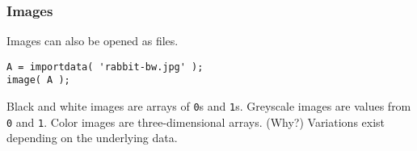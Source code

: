 \documentclass[11pt]{beamer}
\begin{document}
\begin{frame}[fragile]
  \frametitle{Images}
  \Enlarge

  \begin{enumerate}
  \myitem  Images can also be opened as files.
  \end{enumerate}
  \begin{Verbatim}
A = importdata( 'rabbit-bw.jpg' );
image( A );
  \end{Verbatim}
  \pause
  \begin{enumerate}
  \myitem  Black and white images are arrays of \texttt{0}s and \texttt{1}s.
  \myitem  Greyscale images are values from \texttt{0} and \texttt{1}.
  \myitem  Color images are three-dimensional arrays.  (Why?)
  \myitem  Variations exist depending on the underlying data.
  \end{enumerate}
\end{frame}

\end{document}
